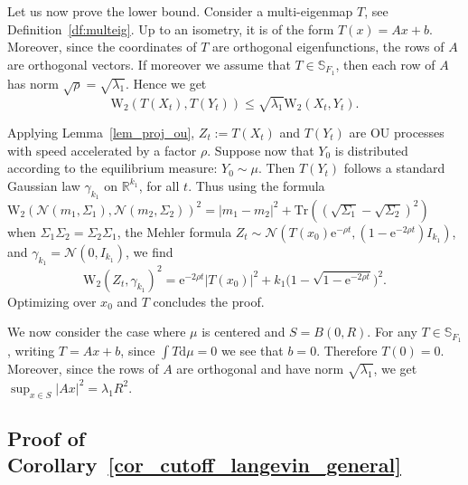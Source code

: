 \documentclass[10pt,reqno]{amsart}
\numberwithin{equation}{section}
\begin{document}
Let us now prove the lower bound. Consider a multi-eigenmap $T$, see
Definition~\ref{df:multeig}. Up to an isometry, it is of the form
$T(x) = Ax + b$. Moreover, since the coordinates of $T$ are orthogonal
eigenfunctions, the rows of $A$ are orthogonal vectors. If moreover we assume
that $T \in \mathbb{S}_{F_1}$, then each row of $A$ has norm
$\sqrt{\rho} = \sqrt{\lambda_1}$. Hence we get
\begin{equation}
  \mathrm{W}_2(T(X_t), T(Y_t)) \leq \sqrt{\lambda_1}\mathrm{W}_2(X_t,Y_t).
\end{equation}

Applying Lemma~\ref{lem_proj_ou}, $Z_t:=T(X_t)$ and $T(Y_t)$ are OU processes
with speed accelerated by a factor $\rho$. Suppose now that $Y_0$ is
distributed according to the equilibrium measure: $Y_0\sim\mu$. Then $T(Y_t)$
follows a standard Gaussian law $\gamma_{k_1}$ on $\mathbb{R}^{k_1}$, for all
$t$. Thus using the formula
$\mathrm{W}_2(\mathcal{N}(m_1,\Sigma_1),\mathcal{N}(m_2,\Sigma_2))^2=|m_1-m_2|^2+\mathrm{Tr}((\sqrt{\Sigma_1}-\sqrt{\Sigma_2})^2)$
when $\Sigma_1\Sigma_2=\Sigma_2\Sigma_1$, the Mehler formula
$Z_t\sim\mathcal{N}(T(x_0)\mathrm{e}^{-\rho t},(1-\mathrm{e}^{-2\rho
  t})I_{k_1})$, and $\gamma_{k_1}=\mathcal{N}(0,I_{k_1})$, we find
\begin{equation}
  \mathrm{W}_2(Z_t, \gamma_{k_1})^2 
  = \mathrm{e}^{-2\rho t}|T(x_0)|^2+k_1\bigl(1-\sqrt{1-\mathrm{e}^{-2\rho
      t}}\bigr)^2.
\end{equation}
Optimizing over $x_0$ and $T$ concludes the proof. 

We now consider the case where $\mu$ is centered and $S = B(0,R)$. For any
$T \in \mathbb{S}_{F_1}$, writing $T = Ax+b$, since $\int T\mathrm{d}\mu = 0$ we see
that $b = 0$. Therefore $T(0) = 0$. Moreover, since the rows of $A$ are
orthogonal and have norm $\sqrt{\lambda_1}$, we get
$\sup_{x\in S}|Ax|^2 = \lambda_1 R^2$.

\subsection{Proof of Corollary~\ref{cor_cutoff_langevin_general}}
\end{document}
